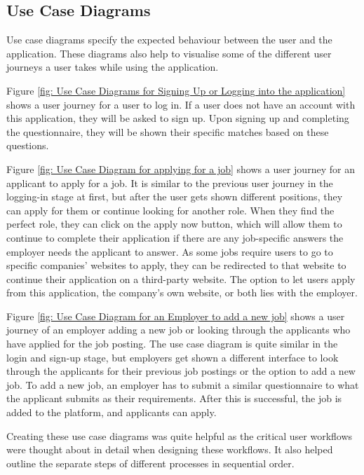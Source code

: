 \subsection{Use Case Diagrams}
Use case diagrams specify the expected behaviour between the user and the application. These diagrams also help to visualise some of the different user journeys a user takes while using the application. 

Figure \ref{fig: Use Case Diagrams for Signing Up or Logging into the application} shows a user journey for a user to log in. If a user does not have an account with this application, they will be asked to sign up. Upon signing up and completing the questionnaire, they will be shown their specific matches based on these questions.

Figure \ref{fig: Use Case Diagram for applying for a job} shows a user journey for an applicant to apply for a job. It is similar to the previous user journey in the logging-in stage at first, but after the user gets shown different positions, they can apply for them or continue looking for another role. When they find the perfect role, they can click on the apply now button, which will allow them to continue to complete their application if there are any job-specific answers the employer needs the applicant to answer. As some jobs require users to go to specific companies' websites to apply, they can be redirected to that website to continue their application on a third-party website. The option to let users apply from this application, the company's own website, or both lies with the employer.

Figure \ref{fig: Use Case Diagram for an Employer to add a new job} shows a user journey of an employer adding a new job or looking through the applicants who have applied for the job posting. The use case diagram is quite similar in the login and sign-up stage, but employers get shown a different interface to look through the applicants for their previous job postings or the option to add a new job. To add a new job, an employer has to submit a similar questionnaire to what the applicant submits as their requirements. After this is successful, the job is added to the platform, and applicants can apply.

Creating these use case diagrams was quite helpful as the critical user workflows were thought about in detail when designing these workflows. It also helped outline the separate steps of different processes in sequential order. 

